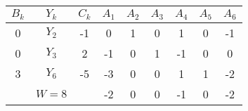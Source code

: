 \begin{tabular}{ccccccccc}
$B_k$  & $Y_k$  & $C_k$  & $A_1$  & $A_2$  & $A_3$  & $A_4$  & $A_5$  & $A_6$ \bigstrut[b]\\
\hline
\hline
0      & $Y_2$  & -1     & 0      & 1      & 0      & 1      & 0      & -1 \bigstrut[t]\\
0      & $Y_3$  & 2      & -1     & 0      & 1      & -1     & 0      & 0 \\
3      & $Y_6$  & -5     & -3     & 0      & 0      & 1      & 1      & -2 \bigstrut[b]\\
\hline
       & $W=8$  &        & -2     & 0      & 0      & -1     & 0      & -2 \bigstrut\\
\hline
\hline
\end{tabular}%
